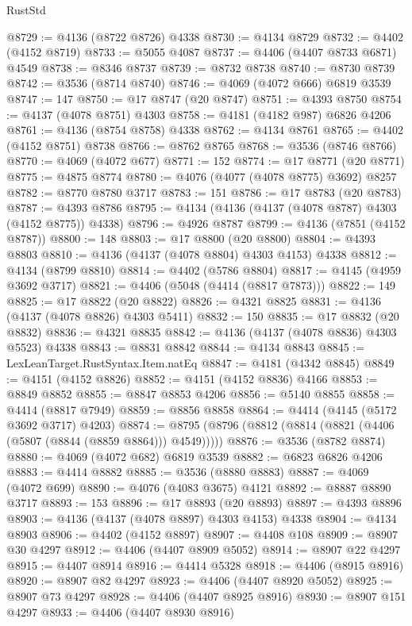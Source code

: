 \begin{lexlean}{RustStd}
\begin{coremodule}
{\begin{coremodule}
{{{{{{{{{{{{{{{{{{{{{{{{{{{{{{{{{{{{{{{{{{{{{{{{{{@8729 := @4136 (@8722 @8726) @4338
@8730 := @4134 @8729
@8732 := @4402 (@4152 @8719)
@8733 := @5055 @4087
@8737 := @4406 (@4407 @8733 @6871) @4549
@8738 := @8346 @8737
@8739 := @8732 @8738
@8740 := @8730 @8739
@8742 := @3536 (@8714 @8740)
@8746 := @4069 (@4072 @666) @6819 @3539
@8747 := 147
@8750 := @17 @8747 (@20 @8747)
@8751 := @4393 @8750
@8754 := @4137 (@4078 @8751) @4303
@8758 := @4181 (@4182 @987) @6826 @4206
@8761 := @4136 (@8754 @8758) @4338
@8762 := @4134 @8761
@8765 := @4402 (@4152 @8751) @8738
@8766 := @8762 @8765
@8768 := @3536 (@8746 @8766)
@8770 := @4069 (@4072 @677)
@8771 := 152
@8774 := @17 @8771 (@20 @8771)
@8775 := @4875 @8774
@8780 := @4076 (@4077 (@4078 @8775) @3692) @8257
@8782 := @8770 @8780 @3717
@8783 := 151
@8786 := @17 @8783 (@20 @8783)
@8787 := @4393 @8786
@8795 := @4134 (@4136 (@4137 (@4078 @8787) @4303 (@4152 @8775)) @4338)
@8796 := @4926 @8787
@8799 := @4136 (@7851 (@4152 @8787))
@8800 := 148
@8803 := @17 @8800 (@20 @8800)
@8804 := @4393 @8803
@8810 := @4136 (@4137 (@4078 @8804) @4303 @4153) @4338
@8812 := @4134 (@8799 @8810)
@8814 := @4402 (@5786 @8804)
@8817 := @4145 (@4959 @3692 @3717)
@8821 := @4406 (@5048 (@4414 (@8817 @7873)))
@8822 := 149
@8825 := @17 @8822 (@20 @8822)
@8826 := @4321 @8825
@8831 := @4136 (@4137 (@4078 @8826) @4303 @5411)
@8832 := 150
@8835 := @17 @8832 (@20 @8832)
@8836 := @4321 @8835
@8842 := @4136 (@4137 (@4078 @8836) @4303 @5523) @4338
@8843 := @8831 @8842
@8844 := @4134 @8843
@8845 := LexLeanTarget.RustSyntax.Item.natEq
@8847 := @4181 (@4342 @8845)
@8849 := @4151 (@4152 @8826)
@8852 := @4151 (@4152 @8836) @4166
@8853 := @8849 @8852
@8855 := @8847 @8853 @4206
@8856 := @5140 @8855
@8858 := @4414 (@8817 @7949)
@8859 := @8856 @8858
@8864 := @4414 (@4145 (@5172 @3692 @3717) @4203)
@8874 := @8795 (@8796 (@8812 (@8814 (@8821 (@4406 (@5807 (@8844 (@8859 @8864))) @4549)))))
@8876 := @3536 (@8782 @8874)
@8880 := @4069 (@4072 @682) @6819 @3539
@8882 := @6823 @6826 @4206
@8883 := @4414 @8882
@8885 := @3536 (@8880 @8883)
@8887 := @4069 (@4072 @699)
@8890 := @4076 (@4083 @3675) @4121
@8892 := @8887 @8890 @3717
@8893 := 153
@8896 := @17 @8893 (@20 @8893)
@8897 := @4393 @8896
@8903 := @4136 (@4137 (@4078 @8897) @4303 @4153) @4338
@8904 := @4134 @8903
@8906 := @4402 (@4152 @8897)
@8907 := @4408 @108
@8909 := @8907 @30 @4297
@8912 := @4406 (@4407 @8909 @5052)
@8914 := @8907 @22 @4297
@8915 := @4407 @8914
@8916 := @4414 @5328
@8918 := @4406 (@8915 @8916)
@8920 := @8907 @82 @4297
@8923 := @4406 (@4407 @8920 @5052)
@8925 := @8907 @73 @4297
@8928 := @4406 (@4407 @8925 @8916)
@8930 := @8907 @151 @4297
@8933 := @4406 (@4407 @8930 @8916)
}}}}}}}}}}}}}}}}}}}}}}}}}}}}}}}}}}}}}}}}}}}}}}}}}}
\end{coremodule}}
\end{coremodule}
\end{lexlean}
